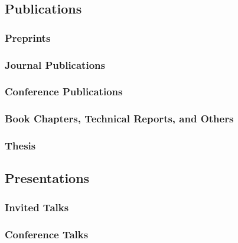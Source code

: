 \documentclass[letterpaper, 11pt]{article}
\begin{document}
\subsection*{Publications}
\subsubsection*{Preprints}
\renewcommand*{\labelenumi}{[P\theenumi]}
\subsubsection*{Journal Publications}
\renewcommand*{\labelenumi}{[J\theenumi]}
\subsubsection*{Conference Publications}
\renewcommand*{\labelenumi}{[C\theenumi]}
\subsubsection*{Book Chapters, Technical Reports, and Others}
\renewcommand*{\labelenumi}{[B\theenumi]}
\subsubsection*{Thesis}
\renewcommand*{\labelenumi}{[T\theenumi]}

\subsection*{Presentations}
\subsubsection*{Invited Talks}
\renewcommand*{\labelenumi}{[I\theenumi]}
\subsubsection*{Conference Talks}
\renewcommand*{\labelenumi}{[M\theenumi]}
\end{document}
